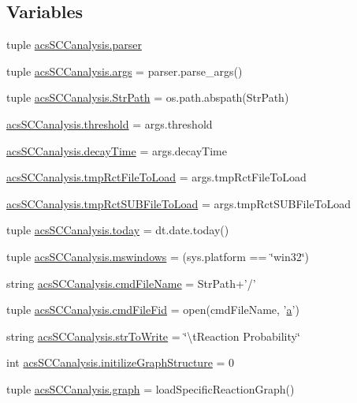 \subsection*{Variables}
\begin{DoxyCompactItemize}
\item 
tuple \hyperlink{a00130_ae47150d99d4a8e7173bb73a271c4a740}{acs\+S\+C\+Canalysis.\+parser}
\item 
tuple \hyperlink{a00130_aa0fabce811f34f18ba6ecbdd5bcbab6a}{acs\+S\+C\+Canalysis.\+args} = parser.\+parse\+\_\+args()
\item 
tuple \hyperlink{a00130_af8add8b37a9c8a7825c0e8f0e7dfd6c1}{acs\+S\+C\+Canalysis.\+Str\+Path} = os.\+path.\+abspath(Str\+Path)
\item 
\hyperlink{a00130_ae1fe4f15ea3fbcf05be2c82cd6f80307}{acs\+S\+C\+Canalysis.\+threshold} = args.\+threshold
\item 
\hyperlink{a00130_a29728f750a3b57770e836db8409767e9}{acs\+S\+C\+Canalysis.\+decay\+Time} = args.\+decay\+Time
\item 
\hyperlink{a00130_aa2f655aa323f5eaef7509135b8af5722}{acs\+S\+C\+Canalysis.\+tmp\+Rct\+File\+To\+Load} = args.\+tmp\+Rct\+File\+To\+Load
\item 
\hyperlink{a00130_a8dd4ba8a8e597b56376879ba4cf1f41d}{acs\+S\+C\+Canalysis.\+tmp\+Rct\+S\+U\+B\+File\+To\+Load} = args.\+tmp\+Rct\+S\+U\+B\+File\+To\+Load
\item 
tuple \hyperlink{a00130_a5498b0a6851ae4d3b2c3035093564e47}{acs\+S\+C\+Canalysis.\+today} = dt.\+date.\+today()
\item 
tuple \hyperlink{a00130_a2abf09620dd1dd990036c67c626b3dee}{acs\+S\+C\+Canalysis.\+mswindows} = (sys.\+platform == \char`\"{}win32\char`\"{})
\item 
string \hyperlink{a00130_a32551f85ad3cd8080b8ad81828276368}{acs\+S\+C\+Canalysis.\+cmd\+File\+Name} = Str\+Path+'/'
\item 
tuple \hyperlink{a00130_a0a501feb02e67bd6a8ba75490709cf89}{acs\+S\+C\+Canalysis.\+cmd\+File\+Fid} = open(cmd\+File\+Name, '\hyperlink{a00035_a2ffdbad9ea59541e59cbd2b938e0770c}{a}')
\item 
string \hyperlink{a00130_a1966f0657c6b477eeb60bde732a201cc}{acs\+S\+C\+Canalysis.\+str\+To\+Write} = \char`\"{}\textbackslash{}t\+Reaction Probability\char`\"{}
\item 
int \hyperlink{a00130_ac6ad18bfc83e8ea3254897d46f990855}{acs\+S\+C\+Canalysis.\+initilize\+Graph\+Structure} = 0
\item 
tuple \hyperlink{a00130_ab45392da38059bf7557c22cbc73e5580}{acs\+S\+C\+Canalysis.\+graph} = load\+Specific\+Reaction\+Graph()

\end{DoxyCompactItemize}
